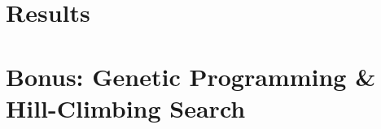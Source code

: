 \documentclass{article}
\begin{document}
\section{Results}
  
  
  
  

\vfill
\pagebreak
\pagebreak
\pagebreak
\section{Bonus: Genetic Programming \& Hill-Climbing Search}
  
\end{document}
